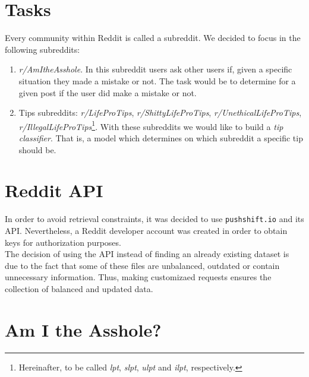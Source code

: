 \documentclass[11pt,a4paper]{article}
\begin{document}
\section{Tasks}
\label{sec:tasks}
Every community within Reddit is called a subreddit. We decided to focus in the
following subreddits:
\begin{enumerate}
	\item \textit{r/AmItheAsshole}. In this subreddit users ask other users if, given a
	specific situation they made a mistake or not. The task would be to determine for a
	given post if the user did make a mistake or not.
	\item Tips subreddits: \textit{r/LifeProTips}, \textit{r/ShittyLifeProTips},
	\textit{r/UnethicalLifeProTips}, \textit{r/IllegalLifeProTips}\footnote{Hereinafter, to be
	called \textit{lpt}, \textit{slpt}, \textit{ulpt} and \textit{ilpt}, respectively.}. With these
	subreddits we would like to build a \textit{tip classifier}. That is, a model which
	determines on which subreddit a specific tip should be. 
\end{enumerate}

\section{Reddit API}
\label{sec:reddit_api}
In order to avoid retrieval constraints, it was decided to use \texttt{pushshift.io} and its
API. Nevertheless, a Reddit developer account was created in order to obtain keys for
authorization purposes.\\

The decision of using the API instead of finding an already existing dataset is 
due to the fact that some of these files are unbalanced, outdated or contain unnecessary information. Thus, making customizaed requests ensures the collection of balanced and updated data. 

\section{Am I the Asshole?}
\label{sec:aita}

\end{document}
